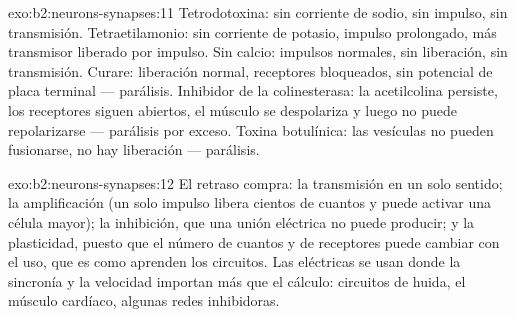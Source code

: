 \begin{solution}{exo:b2:neurons-synapses:11}
Tetrodotoxina: sin corriente de sodio, sin impulso, sin transmisión.
Tetraetilamonio: sin corriente de potasio, impulso prolongado, más
transmisor liberado por impulso. Sin calcio: impulsos normales, sin
liberación, sin transmisión. Curare: liberación normal, receptores
bloqueados, sin potencial de placa terminal --- parálisis. Inhibidor de la
colinesterasa: la acetilcolina persiste, los receptores siguen abiertos,
el músculo se despolariza y luego no puede repolarizarse --- parálisis
por exceso. Toxina botulínica: las vesículas no pueden fusionarse, no hay
liberación --- parálisis.
\end{solution}

\begin{solution}{exo:b2:neurons-synapses:12}
El retraso compra: la transmisión en un solo sentido; la amplificación
(un solo impulso libera cientos de cuantos y puede activar una célula
mayor); la inhibición, que una unión eléctrica no puede producir; y la
plasticidad, puesto que el número de cuantos y de receptores puede
cambiar con el uso, que es como aprenden los circuitos. Las 
eléctricas se usan donde la sincronía y la velocidad importan más que el
cálculo: circuitos de huida, el músculo cardíaco, algunas redes
inhibidoras.
\end{solution}

